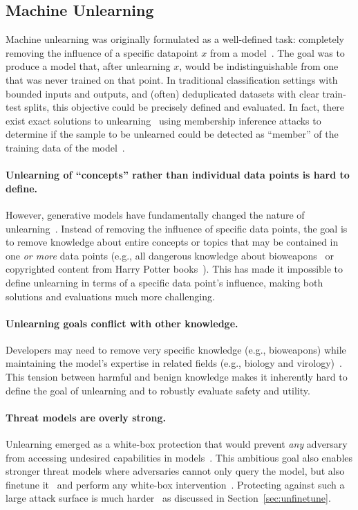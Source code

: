\subsection{Machine Unlearning} %
\label{sec:unlearning}

Machine unlearning was originally formulated as a well-defined task: completely removing the influence of a specific datapoint $x$ from a model~\citep{bourtoule2021machine}. The goal was to produce a model that, after unlearning $x$, would be indistinguishable from one that was never trained on that point. In traditional classification settings with bounded inputs and outputs, and (often) deduplicated datasets with clear train-test splits, this objective could be precisely defined and evaluated. In fact, there exist exact solutions to unlearning~\citep{bourtoule2021machine}%
using membership inference attacks to determine if the sample to be unlearned could be detected as ``member'' of the training data of the model~\citep{shokri2017membership}.

\paragraph{Unlearning of ``concepts'' rather than individual data points is hard to define.}
However, generative models have fundamentally changed the nature of unlearning~\citep{cooper2024machine}. Instead of removing the influence of specific data points, the goal is to remove knowledge about entire concepts or topics that may be contained in one \emph{or more} data points (e.g., all dangerous knowledge about bioweapons~\citep{li2024wmdp} or copyrighted content from Harry Potter books~\citep{eldan2023s}). This has made it impossible to define unlearning in terms of a specific data point's influence, making both solutions and evaluations much more challenging.%

\paragraph{Unlearning goals conflict with other knowledge.} Developers may need to remove very specific knowledge (e.g., bioweapons) while maintaining the model's expertise in related fields (e.g., biology and virology)~\citep{li2024wmdp}. This tension between harmful and benign knowledge makes it inherently hard to define the goal of unlearning and to robustly evaluate safety and utility.

\paragraph{Threat models are overly strong.} Unlearning emerged as a white-box protection that would prevent \emph{any} adversary from accessing undesired capabilities in models~\citep{li2024wmdp}. This ambitious goal also enables stronger threat models where adversaries cannot only query the model, but also finetune it~\citep{hu2024jogging} and perform any white-box intervention~\citep{lucki2024adversarial}. Protecting against such a large attack surface is much harder~\citep{qi2024evaluating} as discussed in Section~\ref{sec:unfinetune}.

